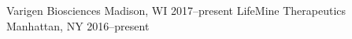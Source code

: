 

\begin{cvhonors}
  \cvhonor
    {Varigen Biosciences} %
    {Madison, WI} %
    {2017--present} %
  \cvhonor
    {LifeMine Therapeutics} %
    {Manhattan, NY} %
    {2016--present} %
\end{cvhonors}